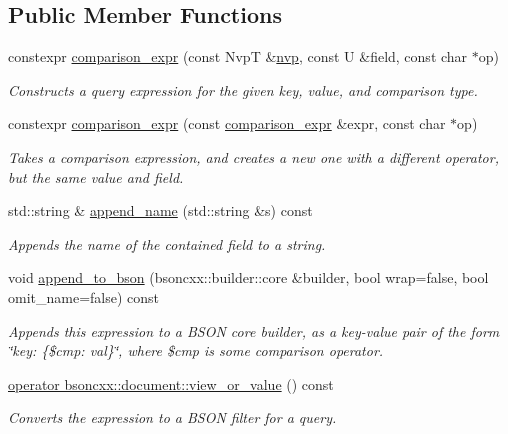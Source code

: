 \subsection*{Public Member Functions}
\begin{DoxyCompactItemize}
\item 
constexpr \hyperlink{classmangrove_1_1comparison__expr_a097fc0cca91f1746c11a78f08a5d4952}{comparison\+\_\+expr} (const NvpT \&\hyperlink{classmangrove_1_1nvp}{nvp}, const U \&field, const char $\ast$op)
\begin{DoxyCompactList}\small\item\em Constructs a query expression for the given key, value, and comparison type. \end{DoxyCompactList}\item 
constexpr \hyperlink{classmangrove_1_1comparison__expr_a0e69c2e073819f3dd6f736e2368385ff}{comparison\+\_\+expr} (const \hyperlink{classmangrove_1_1comparison__expr}{comparison\+\_\+expr} \&expr, const char $\ast$op)
\begin{DoxyCompactList}\small\item\em Takes a comparison expression, and creates a new one with a different operator, but the same value and field. \end{DoxyCompactList}\item 
std\+::string \& \hyperlink{classmangrove_1_1comparison__expr_a24cd33bfa502e97ff0fd16d059192332}{append\+\_\+name} (std\+::string \&s) const \hypertarget{classmangrove_1_1comparison__expr_a24cd33bfa502e97ff0fd16d059192332}{}\label{classmangrove_1_1comparison__expr_a24cd33bfa502e97ff0fd16d059192332}

\begin{DoxyCompactList}\small\item\em Appends the name of the contained field to a string. \end{DoxyCompactList}\item 
void \hyperlink{classmangrove_1_1comparison__expr_a2d534897e90161d1c0a71f9073c640e3}{append\+\_\+to\+\_\+bson} (bsoncxx\+::builder\+::core \&builder, bool wrap=false, bool omit\+\_\+name=false) const 
\begin{DoxyCompactList}\small\item\em Appends this expression to a B\+S\+ON core builder, as a key-\/value pair of the form \char`\"{}key\+: \{\$cmp\+: val\}\char`\"{}, where \$cmp is some comparison operator. \end{DoxyCompactList}\item 
\hyperlink{classmangrove_1_1comparison__expr_ae6101d0a1095f11ded179dd30f4268a6}{operator bsoncxx\+::document\+::view\+\_\+or\+\_\+value} () const 
\begin{DoxyCompactList}\small\item\em Converts the expression to a B\+S\+ON filter for a query. \end{DoxyCompactList}\end{DoxyCompactItemize}


